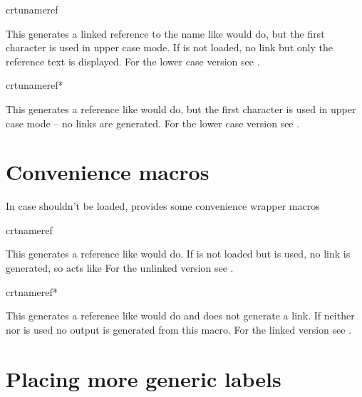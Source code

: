 \documentclass[12pt,a4paper,oneside]{article}
\makeatletter
\newcommand{\chdocextractversion}[1]{%
  \@nameuse{#1}%
}
\makeatother
\begin{document}
\begin{docCommand}[doc new=\chdocextractversion{crossreftoolsversion0.6}]
{crtunameref}{}

This generates a linked reference to the name like  would do, but the first character is used in upper case mode. %
If  is not loaded, no link but only the reference text is displayed. 
For the lower case version see . 
\end{docCommand}

\begin{docCommand}[doc new=\chdocextractversion{crossreftoolsversion0.6}]
{crtunameref*}{}

This generates a reference like  would do, but the first character is used in upper case mode -- no links are generated. 
For the lower case version see . 
\end{docCommand}


\section{Convenience macros}

In case  shouldn't be loaded,  provides some convenience wrapper macros

\begin{docCommand}[doc new=\chdocextractversion{crossreftoolsversion0.6}]
{crtnameref}{}

This generates a reference like  would do. 
If  is not loaded but  is used, no link is generated, so  acts like 
For the unlinked version see . 
\end{docCommand}

\begin{docCommand}[doc new=\chdocextractversion{crossreftoolsversion0.6}]
{crtnameref*}{}

This generates a reference like  would do and does not generate a link. If neither  nor  is used no output is generated from this macro. 
For the linked version see . 
\end{docCommand}


\section{Placing more generic labels}\label{section::placing-generic-labels}
\end{document}

